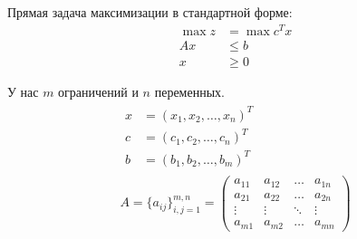 \documentclass[a4paper,article,14pt]{extarticle}
\begin{document}
Прямая задача максимизации в стандартной форме:
\begin{equation} \label{eq:primal_max}
    \begin{aligned}
        \max z & = \max c^Tx \\
        Ax & \le b \\
        x & \ge 0
    \end{aligned}
\end{equation}


У нас \(m\) ограничений и \(n\) переменных.
\begin{equation}
    \begin{gathered}
        \begin{aligned}
            x & = (x_1, x_2, \ldots, x_n)^T \\
            c & = (c_1, c_2, \ldots, c_n)^T \\
            b & = (b_1, b_2, \ldots, b_m)^T
        \end{aligned} \\
        A
        = \{a_{ij}\}_{i,j = 1}^{m,n}
        =
        \begin{pmatrix}
            a_{11} & a_{12} & \ldots & a_{1n} \\
            a_{21} & a_{22} & \ldots & a_{2n} \\
            \vdots & \vdots & \ddots & \vdots \\
            a_{m1} & a_{m2} & \ldots & a_{mn}
        \end{pmatrix}
    \end{gathered}
\end{equation}
\end{document}
